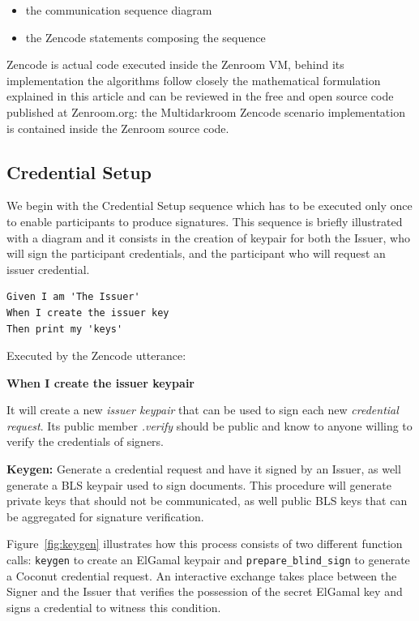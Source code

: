 \documentclass[twocolumn]{article}
\begin{document}
\begin{itemize}
  \item the communication sequence diagram
  \item the Zencode statements composing the sequence 
\end{itemize}

Zencode is actual code executed inside the Zenroom VM, behind its
implementation the algorithms follow closely the mathematical
formulation explained in this article and can be reviewed in the free
and open source code published at Zenroom.org: the Multidarkroom Zencode
scenario implementation is contained inside the Zenroom source
code.

\subsection*{Credential Setup}

We begin with the Credential Setup sequence which has to be executed
only once to enable participants to produce signatures. This sequence is
briefly illustrated with a diagram and it consists in the creation of
keypair for both the Issuer, who will sign the participant credentials,
and the participant who will request an issuer credential.

\begin{lstlisting}[style=zencode,caption={Issuer Keygen}]
Given I am 'The Issuer'
When I create the issuer key
Then print my 'keys'  
\end{lstlisting}

Executed by the Zencode utterance:

\textbf{When I create the issuer keypair}

It will create a new \emph{issuer keypair} that can be used to sign
each new \emph{credential request}. Its public member \emph{.verify}
should be public and know to anyone willing to verify the credentials
of signers.

\textbf{Keygen:} Generate a credential request and have it signed by
an Issuer, as well generate a BLS keypair used to sign documents. This
procedure will generate private keys that should not be communicated,
as well public BLS keys that can be aggregated for signature
verification.

Figure~\ref{fig:keygen} illustrates how this process consists of two
different function calls: \verb!keygen! to create an ElGamal keypair
and \verb!prepare_blind_sign! to generate a Coconut credential
request. An interactive exchange takes place between the Signer and
the Issuer that verifies the possession of the secret ElGamal key and
signs a credential to witness this condition.
\end{document}
